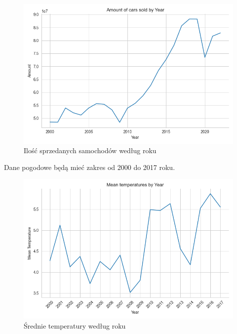 \documentclass[9pt,a4paper,twoside]{rho}
\begin{document}
        \begin{figure}[H]
            \centering
            \includegraphics[width=1\columnwidth]{plots/Amount of cars sold by Year.png}
            \caption{Ilość sprzedanych samochodów według roku}
            \label{fig:amount_of_cars_sold_by_year}
        \end{figure}
    
        Dane pogodowe będą mieć zakres od 2000 do 2017 roku.
    
        \begin{figure}[H]
            \centering
            \includegraphics[width=1\columnwidth]{plots/Mean temperatures by Year.png}
            \caption{Średnie temperatury według roku}
            \label{fig:mean_temperatures_by_year}
        \end{figure}
    
\end{document}
